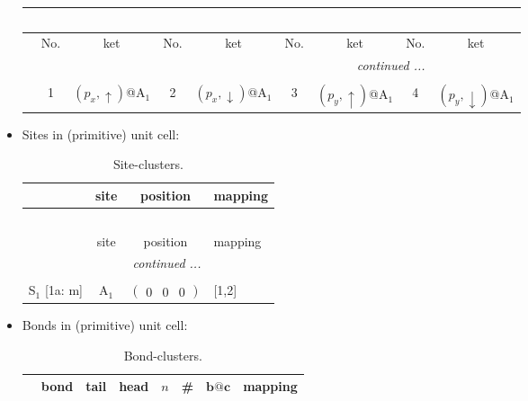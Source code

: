 \documentclass[fleqn,10pt,landscape]{article}
\begin{document}
\begin{itemize}
\begin{center}
\begin{longtable}{c|cc|cc|cc|cc}
\multicolumn{8}{l}{\tablename\ \thetable{}} \\
 \hline \hline
 & No. & ket & No. & ket & No. & ket & No. & ket \\ \hline \endhead

 \hline \hline
\multicolumn{8}{r}{\footnotesize\it continued ...} \\ \endfoot

 \hline \hline
\multicolumn{8}{r}{} \\ \endlastfoot

 & 1 & $(p_{x},\uparrow)$@A$_{1}$ & 2 & $(p_{x},\downarrow)$@A$_{1}$ & 3 & $(p_{y},\uparrow)$@A$_{1}$ & 4 & $(p_{y},\downarrow)$@A$_{1}$ \\
\end{longtable}
\end{center}

\item Sites in (primitive) unit cell:
\begin{center}
\renewcommand{\arraystretch}{1.3}
\begin{longtable}{cc|c|l}
\caption{Site-clusters.}
 \\
 \hline \hline
 & site & position & mapping \\ \hline \endfirsthead

\multicolumn{3}{l}{\tablename\ \thetable{}} \\
 \hline \hline
 & site & position & mapping \\ \hline \endhead

 \hline \hline
\multicolumn{3}{r}{\footnotesize\it continued ...} \\ \endfoot

 \hline \hline
\multicolumn{3}{r}{} \\ \endlastfoot

S$_{1}$ [1a: m] & A$_1$ & $\begin{pmatrix} 0 & 0 & 0 \end{pmatrix}$ & [1,2] \\
\end{longtable}
\end{center}

\item Bonds in (primitive) unit cell:
\begin{center}
\renewcommand{\arraystretch}{1.3}
\begin{longtable}{cc|cc|c|c|c|l}
\caption{Bond-clusters.}
 \\
 \hline \hline
 & bond & tail & head & $n$ & \# & $\bm{b}@\bm{c}$ & mapping \\ \hline \endfirsthead


\end{longtable}
\end{center}
\end{itemize}
\end{document}
